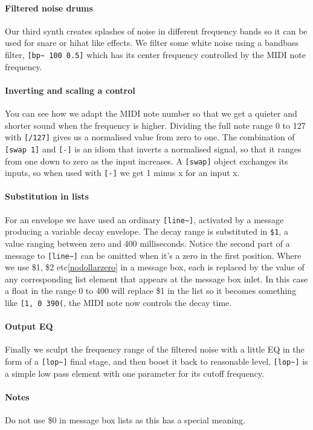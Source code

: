 \paragraph{Filtered noise drums}
Our third synth creates splashes of noise in different frequency bands
so it can be used for snare or hihat like effects. We filter some
white noise using a bandbass filter, \verb+[bp~ 100 0.5]+ which has its
center frequency controlled by the MIDI note frequency.

\paragraph{Inverting and scaling a control}
You can see how we adapt the MIDI
note number so that we get a quieter and shorter sound when the
frequency is higher. Dividing the full note range 0 to 127 with \verb+[/127]+
gives us a normalised value from zero to one. The combination of
\verb+[swap 1]+ and \verb+[-]+ is an idiom that inverts a normalised signal, so that
it ranges from one down to zero as the input increases. A \verb+[swap]+
object exchanges its inputs, so when used with \verb+[-]+ we get 1 minus x for
an input x. 


\paragraph{Substitution in lists}
For an envelope we have used an ordinary \verb+[line~]+, activated
by a message producing a variable decay envelope. The decay range is
substituted in \verb+$1+, a value ranging between zero and 400
milliseconds. Notice the second part of a message to \verb+[line~]+ can
be omitted when it's a zero in the first position.
Where we use \$1, \$2 etc\dag\ref{nodollarzero} in a message box, each is
replaced by the value of any corresponding list element that appears
at the message box inlet. In this case a float in the range 0 to 400
will replace \$1 in the list so it becomes something like
\verb+[1, 0 390(+, the MIDI note now controls the decay time.

\paragraph{Output EQ}
Finally we sculpt the frequency range of the filtered noise with a little EQ in the
form of a \verb+[lop~]+ final stage, and then boost it back to reasonable
level. \verb+[lop~]+ is a simple low pass element with one parameter
for its cutoff frequency.


\paragraph{Notes}
\dag \label{nodollarzero}Do not use \$0 in message box lists as this has a special meaning.
